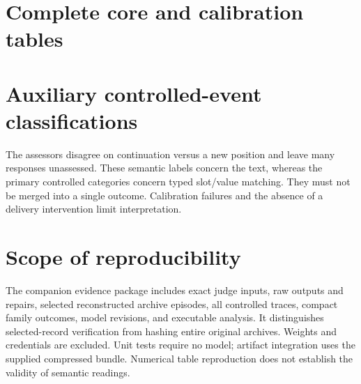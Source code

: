 \section{Complete core and calibration tables}

\begin{table}[H]\centering\small\caption{Paired successes out of 240 families per completed seed. The base model is one shared reference, not three replications. C2: random corruption; C4: two total components; C6: five; A2: no private history; A3: no peer interaction. C4/C5/C6 also differ in role composition and routing.}\label{tab:core}\end{table}

\begin{table}[H]\centering\scriptsize\resizebox{\textwidth}{!}{}\caption{Held-out screens. Score is balanced accuracy for binary dimensions and exact accuracy for categorical dimensions, with abstentions counted as failures. Coverage is substantive predictions/eligible controls; P/F denotes the prespecified screen, not natural-dialogue validation.}\label{tab:calibration}\end{table}

\section{Auxiliary controlled-event classifications}

\begin{table}[H]\centering\small\caption{Fixed 32-event controlled semantic sample, 16 events per arm per judge. These are automatically classified recipient responses, not verified persuasion.}\end{table}

The assessors disagree on continuation versus a new position and leave many responses unassessed. These semantic labels concern the text, whereas the primary controlled categories concern typed slot/value matching. They must not be merged into a single outcome. Calibration failures and the absence of a delivery intervention limit interpretation.

\section{Scope of reproducibility}

The companion evidence package includes exact judge inputs, raw outputs and repairs, selected reconstructed archive episodes, all controlled traces, compact family outcomes, model revisions, and executable analysis. It distinguishes selected-record verification from hashing entire original archives. Weights and credentials are excluded. Unit tests require no model; artifact integration uses the supplied compressed bundle. Numerical table reproduction does not establish the validity of semantic readings.

